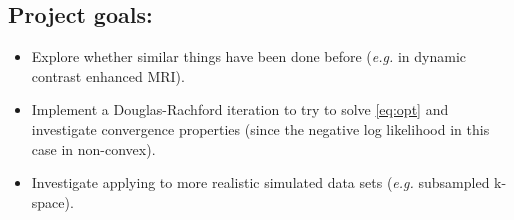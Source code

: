 \documentclass{article}
\newcommand{\argmin}{\operatorname*{argmin}}
\newcommand{\prox}{\operatorname{prox}}
\begin{document}
%

\subsection{Project goals:}
\begin{itemize}
\item Explore whether similar things have been done before (\emph{e.g.} in dynamic contrast enhanced MRI). 
\item Implement a Douglas-Rachford iteration to try to solve \eqref{eq:opt} and investigate convergence properties (since the negative log likelihood in this case in non-convex). 
\item Investigate applying to more realistic simulated data sets (\emph{e.g.} subsampled k-space). 
\end{itemize} 



\end{document}
